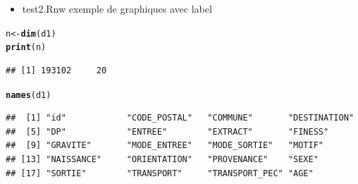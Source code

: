 \documentclass[12pt,english,french,twoside]{report}\usepackage[]{graphicx}\usepackage[]{color}
\makeatletter
\newcommand{\hlkwd}[1]{\textcolor[rgb]{0.737,0.353,0.396}{\textbf{#1}}}%
\newenvironment{kframe}{%
 \def\at@end@of@kframe{}%
 \ifinner\ifhmode%
  \def\at@end@of@kframe{\end{minipage}}%
  \begin{minipage}{\columnwidth}%
 \fi\fi%
 \def\FrameCommand##1{\hskip\@totalleftmargin \hskip-\fboxsep
 \colorbox{shadecolor}{##1}\hskip-\fboxsep
     \hskip-\linewidth \hskip-\@totalleftmargin \hskip\columnwidth}%
 \MakeFramed {\advance\hsize-\width
   \@totalleftmargin\z@ \linewidth\hsize
   \@setminipage}}%
 {\par\unskip\endMakeFramed%
 \at@end@of@kframe}
\newenvironment{knitrout}{}{} %
\makeatother
\begin{document}
\begin{itemize}
  \item test2.Rnw exemple de graphiques avec label
\end{itemize}

\begin{knitrout}
\color{fgcolor}\begin{kframe}
\begin{alltt}
n <- \hlkwd{dim}(d1)
\hlkwd{print}(n)
\end{alltt}
\begin{verbatim}
## [1] 193102     20
\end{verbatim}
\begin{alltt}
\hlkwd{names}(d1)
\end{alltt}
\begin{verbatim}
##  [1] "id"            "CODE_POSTAL"   "COMMUNE"       "DESTINATION"  
##  [5] "DP"            "ENTREE"        "EXTRACT"       "FINESS"       
##  [9] "GRAVITE"       "MODE_ENTREE"   "MODE_SORTIE"   "MOTIF"        
## [13] "NAISSANCE"     "ORIENTATION"   "PROVENANCE"    "SEXE"         
## [17] "SORTIE"        "TRANSPORT"     "TRANSPORT_PEC" "AGE"
\end{verbatim}
\end{kframe}
\end{knitrout}
\end{document}
